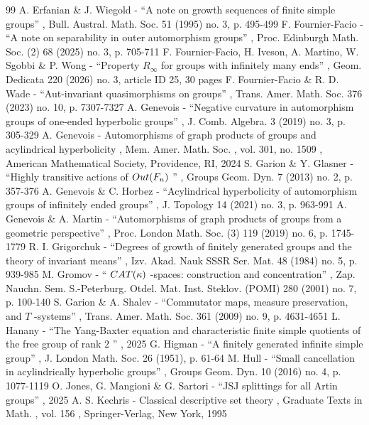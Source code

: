 \documentclass[11pt]{article}
\theoremstyle{definition}
\begin{document}
\begin{thebibliography}{99}
 A. Erfanian \& J. Wiegold - “A note on growth sequences of finite simple groups” , Bull. Austral. Math. Soc. 51 (1995) no. 3, p. 495-499
 F. Fournier-Facio - “A note on separability in outer automorphism groups” , Proc. Edinburgh Math. Soc. (2) 68 (2025) no. 3, p. 705-711
 F. Fournier-Facio, H. Iveson, A. Martino, W. Sgobbi \& P. Wong - “Property $R_\infty $ for groups with infinitely many ends” , Geom. Dedicata 220 (2026) no. 3, article ID 25, 30 pages
 F. Fournier-Facio \& R. D. Wade - “Aut-invariant quasimorphisms on groups” , Trans. Amer. Math. Soc. 376 (2023) no. 10, p. 7307-7327
 A. Genevois - “Negative curvature in automorphism groups of one-ended hyperbolic groups” , J. Comb. Algebra. 3 (2019) no. 3, p. 305-329
 A. Genevois - Automorphisms of graph products of groups and acylindrical hyperbolicity , Mem. Amer. Math. Soc. , vol. 301, no. 1509 , American Mathematical Society, Providence, RI, 2024
 S. Garion \& Y. Glasner - “Highly transitive actions of ${\rm Out}(F_n)$ ” , Groups Geom. Dyn. 7 (2013) no. 2, p. 357-376
 A. Genevois \& C. Horbez - “Acylindrical hyperbolicity of automorphism groups of infinitely ended groups” , J. Topology 14 (2021) no. 3, p. 963-991
 A. Genevois \& A. Martin - “Automorphisms of graph products of groups from a geometric perspective” , Proc. London Math. Soc. (3) 119 (2019) no. 6, p. 1745-1779
 R. I. Grigorchuk - “Degrees of growth of finitely generated groups and the theory of invariant means” , Izv. Akad. Nauk SSSR Ser. Mat. 48 (1984) no. 5, p. 939-985
 M. Gromov - “ ${\rm CAT}(\kappa )$ -spaces: construction and concentration” , Zap. Nauchn. Sem. S.-Peterburg. Otdel. Mat. Inst. Steklov. (POMI) 280 (2001) no. 7, p. 100-140
 S. Garion \& A. Shalev - “Commutator maps, measure preservation, and $T$ -systems” , Trans. Amer. Math. Soc. 361 (2009) no. 9, p. 4631-4651
 L. Hanany - “The Yang-Baxter equation and characteristic finite simple quotients of the free group of rank $2$ ” , 2025
 G. Higman - “A finitely generated infinite simple group” , J. London Math. Soc. 26 (1951), p. 61-64
 M. Hull - “Small cancellation in acylindrically hyperbolic groups” , Groups Geom. Dyn. 10 (2016) no. 4, p. 1077-1119
 O. Jones, G. Mangioni \& G. Sartori - “JSJ splittings for all Artin groups” , 2025
 A. S. Kechris - Classical descriptive set theory , Graduate Texts in Math. , vol. 156 , Springer-Verlag, New York, 1995

\end{thebibliography}
\end{document}
